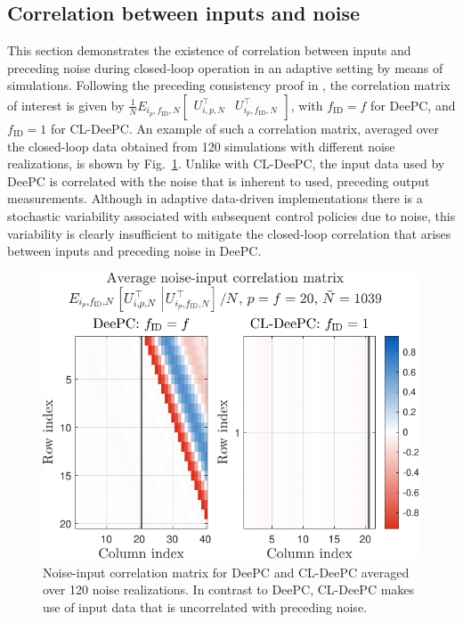 \subsection{Correlation between inputs and noise}
\noindent This section demonstrates the existence of correlation between inputs and preceding noise during closed-loop operation in an adaptive setting by means of simulations. Following the preceding consistency proof in , the correlation matrix of interest is given by $\frac{1}{N}E_{i_p,f_\mathrm{ID},N}\begin{bmatrix}U_{i,p,N}^\top & U_{i_p,f_\mathrm{ID},N}^\top\end{bmatrix}$, with $f_\mathrm{ID}=f$ for \ac{DeePC}, and $f_\mathrm{ID}=1$ for \ac{CL-DeePC}. An example of such a correlation matrix, averaged over the closed-loop data obtained from 120 simulations with different noise realizations, is shown by Fig.~\ref{fig:EfUpf_correlation}. Unlike with \ac{CL-DeePC}, the input data used by \ac{DeePC} is correlated with the noise that is inherent to used, preceding output measurements. Although in adaptive data-driven implementations there is a stochastic variability associated with subsequent control policies due to noise, this variability is clearly insufficient to mitigate the closed-loop correlation that arises between inputs and preceding noise in \ac{DeePC}.
\begin{figure}[t!]
\begin{center}
\includegraphics[width=\columnwidth]{results/figures/Correlation_Nbar_1039_p_20_f_20_Re_1_Ru_1_Rdu_0_Q_100_R_0_dR_10.pdf}    %
\caption{Noise-input correlation matrix for \ac{DeePC} and \ac{CL-DeePC} averaged over 120 noise realizations. In contrast to \ac{DeePC}, \ac{CL-DeePC} makes use of input data that is uncorrelated with preceding noise.}  %
\label{fig:EfUpf_correlation}                                 %
\end{center}                                 %
\end{figure}

